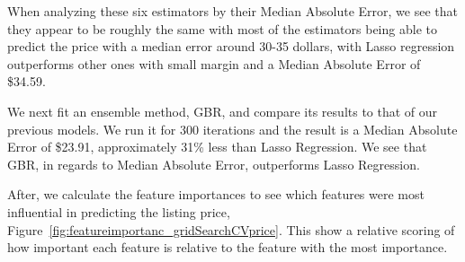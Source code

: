 \documentclass[sigconf]{acmart}
\begin{document}
When analyzing these six estimators by their Median Absolute Error, we see that they appear to be roughly the same with most of the estimators being able to predict the price with a median error around 30-35 dollars, with Lasso regression outperforms other ones with small margin and a Median Absolute Error of \$34.59. 

We next fit an ensemble method, GBR, and compare its results to that of our previous models. We run it for 300 iterations and the result is a Median Absolute Error of \$23.91, approximately 31\% less than Lasso Regression. We see that GBR, in regards to Median Absolute Error, outperforms Lasso Regression. 




After, we calculate the feature importances to see which features were most influential in predicting the listing price, Figure~\ref{fig:featureimportanc_gridSearchCVprice}. This show a relative scoring of how important each feature is relative to the feature with the most importance.
\end{document}
